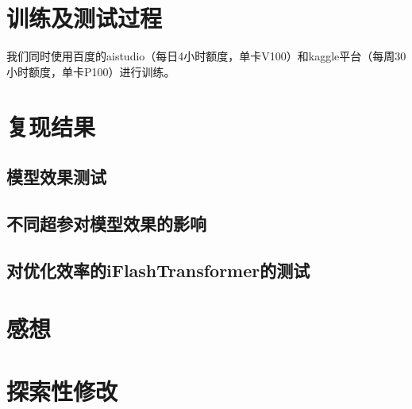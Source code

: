 \documentclass[twoside,12pt]{article}
\begin{document}
\section{训练及测试过程}

我们同时使用百度的aistudio（每日4小时额度，单卡V100）和kaggle平台（每周30小时额度，单卡P100）进行训练。



\section{复现结果}
\subsection{模型效果测试}



\subsection{不同超参对模型效果的影响}



\subsection{对优化效率的iFlashTransformer的测试}





\section{感想}




\section{探索性修改}





\vfill
\end{document}
